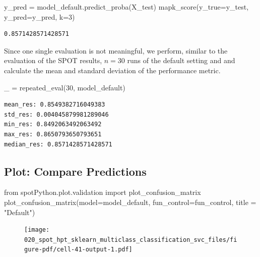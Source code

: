 \documentclass[
  letterpaper,
  DIV=11,
  numbers=noendperiod]{scrreprt}
\newenvironment{Shaded}{\begin{snugshade}}{\end{snugshade}}
\newcommand{\DecValTok}[1]{\textcolor[rgb]{0.68,0.00,0.00}{#1}}
\newcommand{\ImportTok}[1]{\textcolor[rgb]{0.00,0.46,0.62}{#1}}
\newcommand{\NormalTok}[1]{\textcolor[rgb]{0.00,0.23,0.31}{#1}}
\newcommand{\OperatorTok}[1]{\textcolor[rgb]{0.37,0.37,0.37}{#1}}
\newcommand{\StringTok}[1]{\textcolor[rgb]{0.13,0.47,0.30}{#1}}
\begin{document}
\begin{Shaded}
\begin{Highlighting}[]
\NormalTok{y\_pred }\OperatorTok{=}\NormalTok{ model\_default.predict\_proba(X\_test)}
\NormalTok{mapk\_score(y\_true}\OperatorTok{=}\NormalTok{y\_test, y\_pred}\OperatorTok{=}\NormalTok{y\_pred, k}\OperatorTok{=}\DecValTok{3}\NormalTok{)}
\end{Highlighting}
\end{Shaded}

\begin{verbatim}
0.8571428571428571
\end{verbatim}

Since one single evaluation is not meaningful, we perform, similar to
the evaluation of the SPOT results, \(n=30\) runs of the default setting
and and calculate the mean and standard deviation of the performance
metric.

\begin{Shaded}
\begin{Highlighting}[]
\NormalTok{\_ }\OperatorTok{=}\NormalTok{ repeated\_eval(}\DecValTok{30}\NormalTok{, model\_default)}
\end{Highlighting}
\end{Shaded}

\begin{verbatim}
mean_res: 0.8549382716049383
std_res: 0.004045879981289046
min_res: 0.8492063492063492
max_res: 0.8650793650793651
median_res: 0.8571428571428571
\end{verbatim}

\hypertarget{plot-compare-predictions-3}{%
\subsection{Plot: Compare
Predictions}\label{plot-compare-predictions-3}}

\begin{Shaded}
\begin{Highlighting}[]
\ImportTok{from}\NormalTok{ spotPython.plot.validation }\ImportTok{import}\NormalTok{ plot\_confusion\_matrix}
\NormalTok{plot\_confusion\_matrix(model}\OperatorTok{=}\NormalTok{model\_default, fun\_control}\OperatorTok{=}\NormalTok{fun\_control, title }\OperatorTok{=} \StringTok{"Default"}\NormalTok{)}
\end{Highlighting}
\end{Shaded}

\begin{figure}[H]

{\centering \texttt{[image: 020\_spot\_hpt\_sklearn\_multiclass\_classification\_svc\_files/figure-pdf/cell-41-output-1.pdf]}

}

\end{figure}
\end{document}
